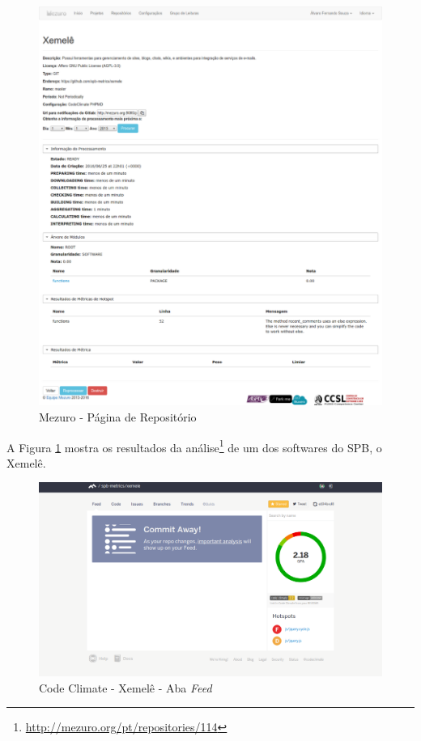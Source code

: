 \begin{figure}[!htb]
	\centering
    \includegraphics[keepaspectratio=true,scale=0.3]
    {figuras/mezuro-repositorio-view.eps}
  \caption{Mezuro - Página de Repositório}
	\label{fig:mezuro-repositorio-view-xemele}
\end{figure}

A Figura \ref{fig:mezuro-repositorio-view-xemele}
mostra os resultados da análise\footnote{\url{http://mezuro.org/pt/repositories/114}}
de um dos softwares do SPB, o Xemelê.

\newpage

\begin{figure}[!htb]
	\centering
    \includegraphics[keepaspectratio=true,scale=0.35]
    {figuras/codeclimate_feed.eps}
  \caption{Code Climate - Xemelê - Aba \textit{Feed}}
	\label{fig:codeclimate_feed}
\end{figure}

